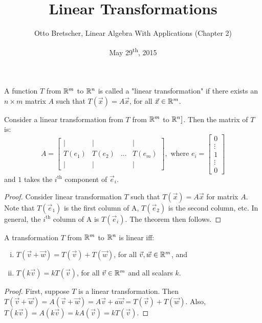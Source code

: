 \documentclass[a4paper,11pt]{article}
\title{Linear Transformations}
\author{Otto Bretscher, Linear Algebra With Applications (Chapter 2)}
\date{May 29\textsuperscript{th}, 2015}
\begin{document}
\maketitle
{}

\begin{outline}

    A function \(T\) from \(\mathbb{R}^m\) to \(\mathbb{R}^n\) is called a "linear transformation" if there exists 
    an \(n \times m\) matrix \(A\) such that \(T(\vec{x}) = A\vec{x}\), for all \(\vec{x} \in \mathbb{R}^m\).
    
    Consider a linear transformation from \(T\) from \(\mathbb{R}^m\) to \(\mathbb{R}^n]\). Then the matrix of \(T\) is:
    \[
      A = 
        \begin{bmatrix} 
          \vert  & \vert  &        & \vert  \\
          T(e_1) & T(e_2) & \ldots & T(e_m) \\
          \vert  & \vert  &        & \vert
        \end{bmatrix}
      ,\text{ where } e_{i} = \begin{bmatrix} 0 \\ \vdots \\ 1 \\ \vdots \\ 0 \end{bmatrix}
    \]
    and \(1\) takes the \(i^{\text{th}}\) component of \(\vec{e}_i\).
    
    \begin{proof}
      Consider linear transformation \(T\) such that \(T(\vec{x}) = A\vec{x}\) for matrix \(A\). Note that
      \(T(\vec{e}_1)\) is the first column of A, \(T(\vec{e}_2)\) is the second column, etc. In general, the
      \(i^{\text{th}}\) column of A is \(T(\vec{e}_i)\). The theorem then follows.
    \end{proof}
    
    A transformation \(T\) from \(\mathbb{R}^m\) to \(\mathbb{R}^n\) is linear iff:
    \begin{enumerate}[i.]
      \item \(T(\vec{v} + \vec{w}) = T(\vec{v}) + T(\vec{w})\), for all \(\vec{v}, \vec{w} \in \mathbb{R}^m\), and
      \item \(T(k\vec{v}) = kT(\vec{v})\), for all \(\vec{v} \in \mathbb{R}^m\) and all scalars \(k\).
    \end{enumerate}
    
    \begin{proof}
      \forward
        First, suppose \(T\) is a linear transformation. Then \(T(\vec{v} + \vec{w}) = A(\vec{v} + \vec{w})
        = A\vec{v} + a\vec{w} = T(\vec{v}) + T(\vec{w})\). Also, \(T(k\vec{v}) = A(k\vec{v}) = kA(\vec{v}) 
        = kT(\vec{v})\).
        

\end{proof}
\end{outline}
\end{document}
